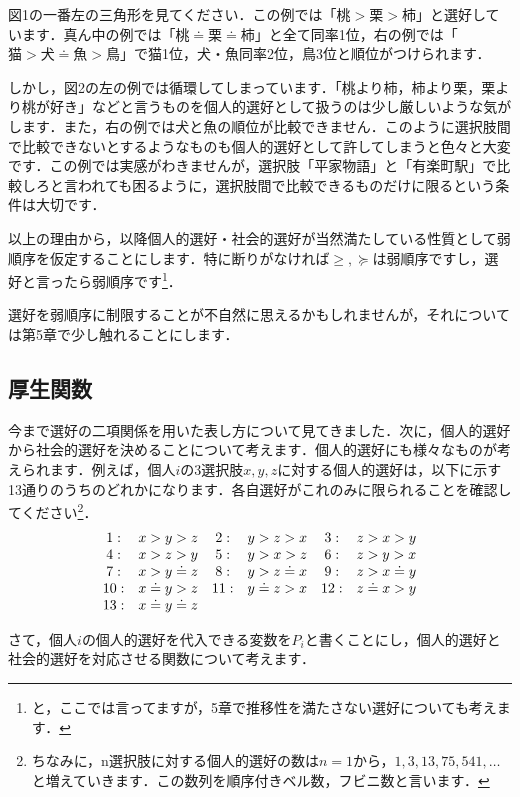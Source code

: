 図1の一番左の三角形を見てください．この例では「$桃 > 栗 > 柿$」と選好しています．真ん中の例では「$桃\doteq 栗\doteq 柿$」と全て同率1位，右の例では「$猫>犬\doteq 魚>鳥$」で猫1位，犬・魚同率2位，鳥3位と順位がつけられます．

しかし，図2の左の例では循環してしまっています．「桃より柿，柿より栗，栗より桃が好き」などと言うものを個人的選好として扱うのは少し厳しいような気がします．また，右の例では犬と魚の順位が比較できません．このように選択肢間で比較できないとするようなものも個人的選好として許してしまうと色々と大変です．この例では実感がわきませんが，選択肢「平家物語」と「有楽町駅」で比較しろと言われても困るように，選択肢間で比較できるものだけに限るという条件は大切です．

以上の理由から，以降個人的選好・社会的選好が当然満たしている性質として弱順序を仮定することにします．特に断りがなければ$\ge,\succeq$は弱順序ですし，選好と言ったら弱順序です\footnote{と，ここでは言ってますが，5章で推移性を満たさない選好についても考えます．}．

選好を弱順序に制限することが不自然に思えるかもしれませんが，それについては第5章で少し触れることにします．

\subsection{厚生関数}
今まで選好の二項関係を用いた表し方について見てきました．次に，個人的選好から社会的選好を決めることについて考えます．個人的選好にも様々なものが考えられます．例えば，個人$i$の3選択肢$x,y,z$に対する個人的選好は，以下に示す13通りのうちのどれかになります．各自選好がこれのみに限られることを確認してください\footnote{ちなみに，n選択肢に対する個人的選好の数は$n=1$から，$1,3,13,75,541,\dots$と増えていきます．この数列を順序付きベル数，フビニ数と言います．}．
\begin{equation*}
\begin{array}[h]{cccccc}
    1 : & x > y > z &
    2 : & y > z > x &
    3 : & z > x > y \\
    4 : & x > z > y &
    5 : & y > x > z &
    6 : & z > y > x \\
    7 : & x > y \doteq z &
    8 : & y > z \doteq x &
    9 : & z > x \doteq y \\
    10: & x \doteq y > z &
    11: & y \doteq z > x &
    12: & z \doteq x > y \\
    13: & x \doteq y \doteq z & & & &
\end{array}
\end{equation*}

さて，個人$i$の個人的選好を代入できる変数を$P_i$と書くことにし，個人的選好と社会的選好を対応させる関数について考えます．

